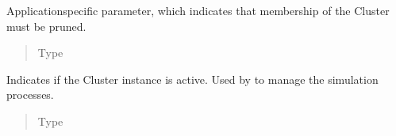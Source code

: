 \documentclass[letterpaper,10pt,english]{sphinxmanual}
\begin{document}
\begin{fulllineitems}
\begin{fulllineitems}
\begin{quote}
\begin{description}
\end{description}\end{quote}

\end{fulllineitems}


\begin{fulllineitems}
\label{\detokenize{app.domain:app.domain.cluster_groups.Cluster.redundant_size}}
Application\sphinxhyphen{}specific parameter, which indicates that membership
of the Cluster must be pruned.
\begin{quote}\begin{description}
\item[{Type}] \leavevmode
{}

\end{description}\end{quote}

\end{fulllineitems}


\begin{fulllineitems}
\label{\detokenize{app.domain:app.domain.cluster_groups.Cluster.running}}
Indicates if the Cluster instance is active. Used by
{\hyperref[\detokenize{app.domain:app.domain.master_servers.Master}]{}} to manage the
simulation processes.
\begin{quote}\begin{description}
\item[{Type}] \leavevmode
{}

\end{description}\end{quote}

\end{fulllineitems}



\end{fulllineitems}
\end{document}
